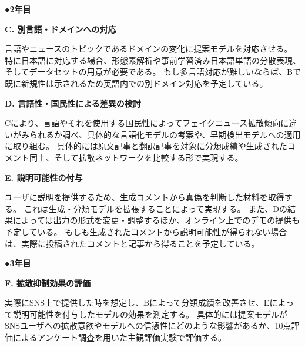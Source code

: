 {	%


	\noindent
	●\textbf{2年目}

	\noindent
	\textbf{C. 別言語・ドメインへの対応}

	言語やニュースのトピックであるドメインの変化に提案モデルを対応させる。
	特に日本語に対応する場合、形態素解析や事前学習済み日本語単語の分散表現、そしてデータセットの用意が必要である。
	もし多言語対応が難しいならば、Bで既に新規性は示されるため英語内での別ドメイン対応を予定している。

	\noindent
	\textbf{D. 言語性・国民性による差異の検討}

	Cにより、言語やそれを使用する国民性によってフェイクニュース拡散傾向に違いがみられるか調べ、具体的な⾔語化モデルの考案や、早期検出モデルへの適⽤に取り組む。
	具体的には原文記事と翻訳記事を対象に分類成績や生成されたコメント同士、そして拡散ネットワークを比較する形で実現する。

	\noindent
	\textbf{E. 説明可能性の付与}

	ユーザに説明を提供するため、生成コメントから真偽を判断した材料を取得する。
	これは生成・分類モデルを拡張することによって実現する。
	また、Dの結果によっては出力の形式を変更・調整するほか、オンライン上でのデモの提供も予定している。
	もしも生成されたコメントから説明可能性が得られない場合は、実際に投稿されたコメントと記事から得ることを予定している。

	\noindent
	●\textbf{3年目}

	\noindent
	\textbf{F. 拡散抑制効果の評価}

	実際にSNS上で提供した時を想定し、Bによって分類成績を改善させ、Eによって説明可能性を付与したモデルの効果を測定する。
	具体的には提案モデルがSNSユーザへの拡散意欲やモデルへの信憑性にどのような影響があるか、10点評価によるアンケート調査を用いた主観評価実験で評価する。

}

